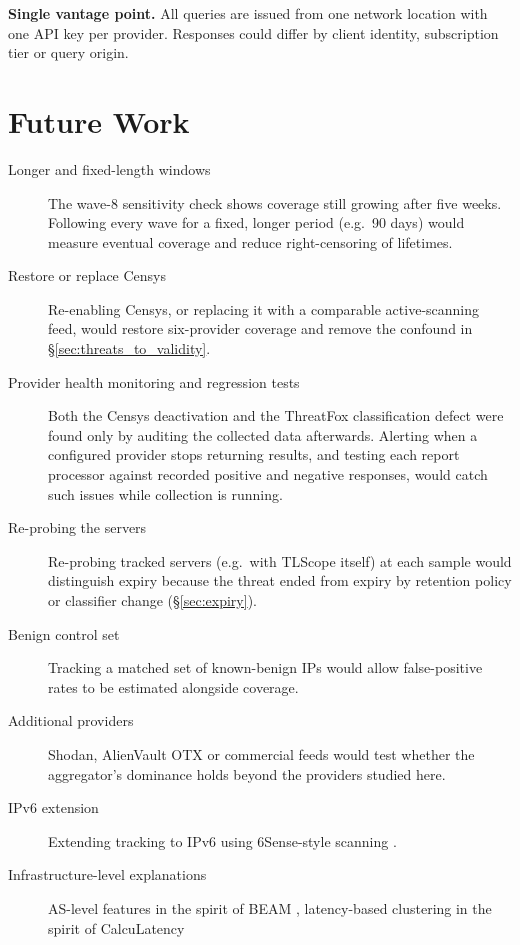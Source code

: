 \textbf{Single vantage point.} All queries are issued from one network location with one API key per
provider. Responses could differ by client identity, subscription tier or query origin.

\chapter{Future Work}
\label{ch:future_work}

\begin{description}
  \item[Longer and fixed-length windows] The wave-8 sensitivity check shows coverage still growing
    after five weeks. Following every wave for a fixed, longer period (e.g.\ 90 days) would measure
    eventual coverage and reduce right-censoring of lifetimes.
  \item[Restore or replace Censys] Re-enabling Censys, or replacing it with a comparable
    active-scanning feed, would restore six-provider coverage and remove the confound in
    \S\ref{sec:threats_to_validity}.
  \item[Provider health monitoring and regression tests] Both the Censys deactivation and the
    ThreatFox classification defect were found only by auditing the collected data afterwards.
    Alerting when a configured provider stops returning results, and testing each report processor
    against recorded positive and negative responses, would catch such issues while collection is
    running.
  \item[Re-probing the servers] Re-probing tracked servers (e.g.\ with TLScope
    itself) at each sample would distinguish expiry because the threat ended from expiry by
    retention policy or classifier change (\S\ref{sec:expiry}).
  \item[Benign control set] Tracking a matched set of known-benign IPs would allow false-positive
    rates to be estimated alongside coverage.
  \item[Additional providers] Shodan, AlienVault OTX or commercial feeds would test whether the
    aggregator's dominance holds beyond the providers studied here.
  \item[IPv6 extension] Extending tracking to IPv6 using 6Sense-style scanning
    \cite{williams2024sixsense}.
  \item[Infrastructure-level explanations] AS-level features in the spirit of BEAM
    \cite{chen2024beam}, latency-based clustering in the spirit of CalcuLatency

\end{description}
